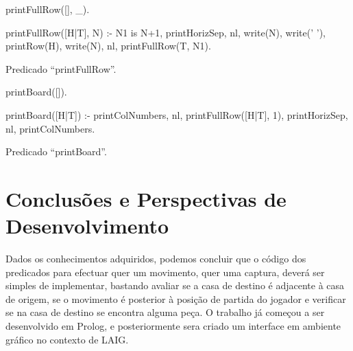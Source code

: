 \documentclass[15pt,a4paper]{article}
\begin{document}
\begin{code}[H]
	\begin{verbatimtab}

printFullRow([], _).

printFullRow([H|T], N) :-
	N1 is N+1,
	printHorizSep,
	nl,
	write(N),
	write(' '),
	printRow(H),
	write(N),
	nl,
	printFullRow(T, N1).
\end{verbatimtab}
\caption{Predicado ``printFullRow''.}
\end{code}



\begin{code}[H]
	\begin{verbatimtab}

printBoard([]).

printBoard([H|T]) :-
	printColNumbers,
	nl,
	printFullRow([H|T], 1),
	printHorizSep,
	nl,
	printColNumbers.
\end{verbatimtab}
\caption{Predicado ``printBoard''.}
\end{code}


\newpage

\section{Conclusões e Perspectivas de Desenvolvimento}


Dados os conhecimentos adquiridos, podemos concluir que o código dos predicados para efectuar quer um movimento, quer uma captura, deverá ser simples de implementar, bastando avaliar se a casa de destino é adjacente à casa de origem, se o movimento é posterior à posição de partida do jogador e verificar se na casa de destino se encontra alguma peça. 
O trabalho já começou a ser desenvolvido em Prolog, e posteriormente sera criado um interface em ambiente gráfico no contexto de LAIG.
\end{document}

